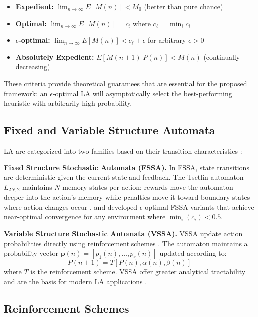 \documentclass[12pt,oneside]{book}
\begin{document}
\begin{itemize}
    \item \textbf{Expedient:} $\lim_{n\to\infty} E[M(n)] < M_0$ (better than pure chance)
    \item \textbf{Optimal:} $\lim_{n\to\infty} E[M(n)] = c_\ell$ where $c_\ell = \min_i c_i$
    \item \textbf{$\epsilon$-optimal:} $\lim_{n\to\infty} E[M(n)] < c_\ell + \epsilon$ for arbitrary $\epsilon > 0$
    \item \textbf{Absolutely Expedient:} $E[M(n+1)|P(n)] < M(n)$ (continually decreasing)
\end{itemize}

These criteria provide theoretical guarantees that are essential for the proposed framework: an $\epsilon$-optimal LA will asymptotically select the best-performing heuristic with arbitrarily high probability.

\subsection{Fixed and Variable Structure Automata}
\label{subsec:fssa-vssa}

LA are categorized into two families based on their transition characteristics \citep{Narendra1989, Bisong2018}:

\textbf{Fixed Structure Stochastic Automata (FSSA).} In FSSA, state transitions are deterministic given the current state and feedback. The Tsetlin automaton $L_{2N,2}$ maintains $N$ memory states per action; rewards move the automaton deeper into the action's memory while penalties move it toward boundary states where action changes occur \citep{Tsetlin1961}. \citet{Krinsky1964} and \citet{Krylov1964} developed $\epsilon$-optimal FSSA variants that achieve near-optimal convergence for any environment where $\min_i(c_i) < 0.5$.

\textbf{Variable Structure Stochastic Automata (VSSA).} VSSA update action probabilities directly using reinforcement schemes \citep{Varshavskii1963}. The automaton maintains a probability vector $\mathbf{p}(n) = [p_1(n), \ldots, p_r(n)]$ updated according to:
\begin{equation}
    P(n+1) = T[P(n), \alpha(n), \beta(n)]
\end{equation}
where $T$ is the reinforcement scheme. VSSA offer greater analytical tractability and are the basis for modern LA applications \citep{ThathacharSastry2002}.

\subsection{Reinforcement Schemes}
\label{subsec:reinforcement-schemes}
\end{document}
